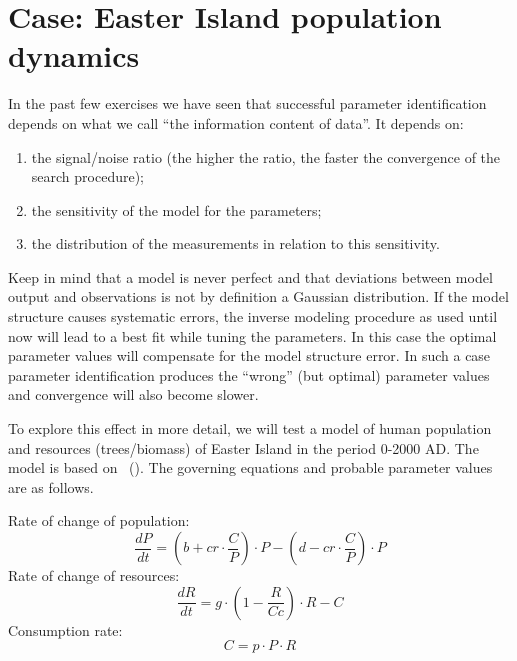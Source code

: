 \section{Case: Easter Island population dynamics}


In the past few exercises we have seen that successful parameter identification depends on what we call ``the information content of data''. It depends on:
\begin{enumerate}
\item{the signal/noise ratio (the higher the ratio, the faster the convergence of the search procedure);}
\item{the sensitivity of the model for the parameters;}
\item{the distribution of the measurements in relation to this sensitivity.}
\end{enumerate}

Keep in mind that a model is never perfect and that deviations between model output and observations is not by definition a Gaussian distribution. If the model structure causes systematic errors, the inverse modeling procedure as used until now will lead to a best fit while tuning the parameters. In this case the optimal parameter values will compensate for the model structure error. In such a case parameter identification produces the ``wrong'' (but optimal) parameter values and convergence will also become slower.

To explore this effect in more detail, we will test a model of human population and resources (trees/biomass) of Easter Island in the period 0-2000 AD. The model is based on \citeauthor*{bran-tayl1998}~(\citeyear{bran-tayl1998}). The governing equations and probable parameter values are as follows.


Rate of change of population:
\begin{equation}
\frac{dP}{dt} = (b+cr\cdot{}\frac{C}{P})\cdot{}P-(d-cr\cdot{}\frac{C}{P})\cdot{P}
\end{equation}
Rate of change of resources:
\begin{equation}
\frac{dR}{dt} = g\cdot{}(1-\frac{R}{Cc})\cdot{}R-C
\end{equation}
Consumption rate:
\begin{equation}
C = p\cdot{}P\cdot{}R
\end{equation}


